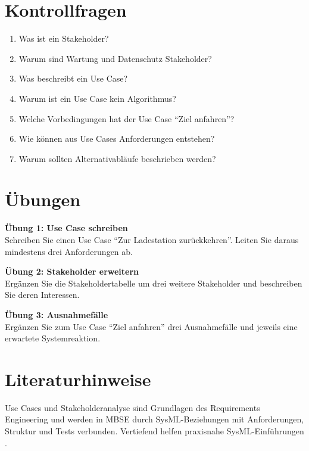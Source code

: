 \section{Kontrollfragen}
\begin{enumerate}
    \item Was ist ein Stakeholder?
    \item Warum sind Wartung und Datenschutz Stakeholder?
    \item Was beschreibt ein Use Case?
    \item Warum ist ein Use Case kein Algorithmus?
    \item Welche Vorbedingungen hat der Use Case \enquote{Ziel anfahren}?
    \item Wie können aus Use Cases Anforderungen entstehen?
    \item Warum sollten Alternativabläufe beschrieben werden?
\end{enumerate}

\section{Übungen}
\begin{uebungbox}
\textbf{Übung 1: Use Case schreiben}\\
Schreiben Sie einen Use Case \enquote{Zur Ladestation zurückkehren}. Leiten Sie daraus mindestens drei Anforderungen ab.
\end{uebungbox}

\begin{uebungbox}
\textbf{Übung 2: Stakeholder erweitern}\\
Ergänzen Sie die Stakeholdertabelle um drei weitere Stakeholder und beschreiben Sie deren Interessen.
\end{uebungbox}

\begin{uebungbox}
\textbf{Übung 3: Ausnahmefälle}\\
Ergänzen Sie zum Use Case \enquote{Ziel anfahren} drei Ausnahmefälle und jeweils eine erwartete Systemreaktion.
\end{uebungbox}

\section{Literaturhinweise}
Use Cases und Stakeholderanalyse sind Grundlagen des Requirements Engineering und werden in MBSE durch SysML-Beziehungen mit Anforderungen, Struktur und Tests verbunden. Vertiefend helfen praxisnahe SysML-Einführungen \cite{delligatti2014,friedenthal2014}.
